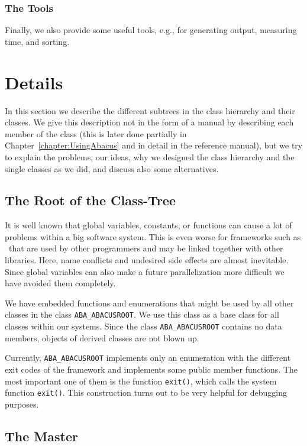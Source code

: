 \subsubsection{The Tools}

Finally, we also provide some useful tools, e.g., for generating
output, measuring time, and sorting.

\section{Details}
\label{section:DesignDetails}

In this section we describe the different subtrees in the class hierarchy
and their classes. We give this description not in the form of
a manual by describing each member of the class (this is later done 
partially in Chapter~\ref{chapter:UsingAbacus} and in detail
in the reference manual), but we try to explain the problems,
our ideas, why we designed the class hierarchy and the single classes as
we did, and discuss also some alternatives.

\subsection{The Root of the Class-Tree}

\noindent
It is well known that global variables, constants, or functions can
cause a lot of problems within a big software system. This is even worse
for frameworks such as \ABACUS\ that are used by other programmers and 
may be linked together with other libraries. Here, name conflicts
and undesired side effects are almost inevitable. Since global
variables can also make a future parallelization
more difficult we have avoided them completely.

We have embedded functions and enumerations that might be used by
all other classes in the class {\tt ABA\_ABACUSROOT}. 
We use this class
as a base class for all classes within our systems.
Since the class {\tt ABA\_ABACUSROOT} contains no
data members, objects of derived classes are not blown up.

Currently, {\tt ABA\_ABACUSROOT} implements only an enumeration with the 
different exit codes of the framework and implements some public member
functions. The most important one of them is the
function {\tt exit()}, which calls the system function {\tt exit()}.
This construction turns out to be very helpful for debugging purposes.

\subsection{The Master}

